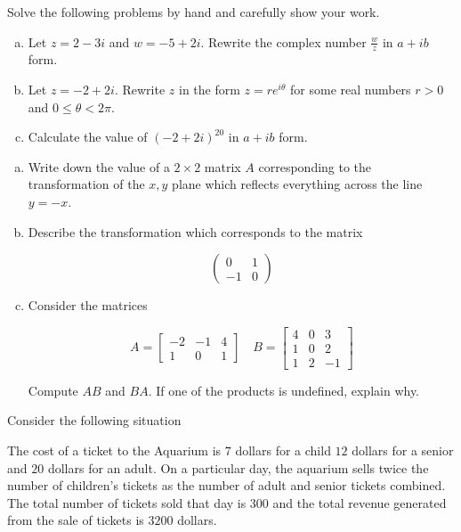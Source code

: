 \documentclass[11pt]{exam}
\theoremstyle{definition}
\begin{document}
\begin{questions}
Solve the following problems by hand and carefully show your work.

\begin{enumerate}[(a)]
\item Let $z=2-3i$ and $w=-5+2i$.  Rewrite the complex number $\frac{w}{z}$ in $a+ib$ form.
\vspace{2.7in}
\item Let $z = -2 + 2i$.  Rewrite $z$ in the form $z = re^{i\theta}$ for some real numbers $r>0$ and $0\leq \theta < 2\pi$.
\vspace{2.7in}
\item Calculate the value of $(-2+2i)^{20}$ in $a + ib$ form.
\end{enumerate}


\newpage
\question[10]\mbox{}

\begin{enumerate}[(a)]
\item Write down the value of a $2\times 2$ matrix $A$ corresponding to the transformation of the $x,y$ plane which reflects everything across the line $y=-x$.
\vspace{2in}
\item Describe the transformation which corresponds to the matrix

$$\left(\begin{array}{cc}
  0 &  1\\
 -1 &  0
\end{array}\right)$$
\vspace{3in}

\item Consider the matrices

$$A = \left[\begin{array}{ccc} -2 & -1 & 4\\ 1 & 0 & 1\end{array}\right]
\quad
B = \left[\begin{array}{ccc} 4 & 0 & 3\\ 1 & 0 & 2\\ 1 & 2 & -1\end{array}\right]$$

Compute $AB$ and $BA$.  If one of the products is undefined, explain why.
\end{enumerate}

\newpage
\question[10]\mbox{}

Consider the following situation

The cost of a ticket to the Aquarium is $7$ dollars for a child $12$ dollars for a senior and $20$ dollars for an adult.
On a particular day, the aquarium sells twice the number of children's tickets as the number of adult and senior tickets combined.
The total number of tickets sold that day is $300$ and the total revenue generated from the sale of tickets is $3200$ dollars.


\end{questions}
\end{document}
